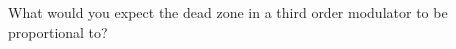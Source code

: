 \subsection{}
What would you expect the dead zone in a third order modulator to be proportional to?
